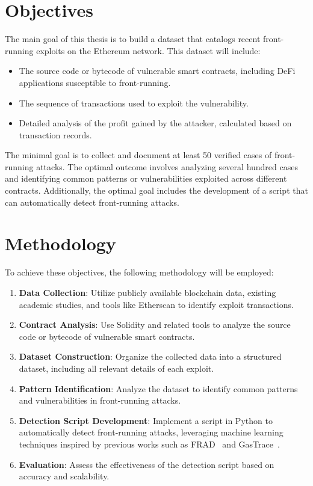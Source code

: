 \documentclass{scrartcl}
\begin{document}
\section*{Objectives}

The main goal of this thesis is to build a dataset that catalogs recent front-running exploits on the Ethereum network. This dataset will include:

\begin{itemize}
    \item The source code or bytecode of vulnerable smart contracts, including DeFi applications susceptible to front-running.
    \item The sequence of transactions used to exploit the vulnerability.
    \item Detailed analysis of the profit gained by the attacker, calculated based on transaction records.
\end{itemize}

The minimal goal is to collect and document at least 50 verified cases of front-running attacks. The optimal outcome involves analyzing several hundred cases and identifying common patterns or vulnerabilities exploited across different contracts. Additionally, the optimal goal includes the development of a script that can automatically detect front-running attacks.

\section*{Methodology}

To achieve these objectives, the following methodology will be employed:

\begin{enumerate}
    \item \textbf{Data Collection}: Utilize publicly available blockchain data, existing academic studies, and tools like Etherscan to identify exploit transactions.
    \item \textbf{Contract Analysis}: Use Solidity and related tools to analyze the source code or bytecode of vulnerable smart contracts.
    \item \textbf{Dataset Construction}: Organize the collected data into a structured dataset, including all relevant details of each exploit.
    \item \textbf{Pattern Identification}: Analyze the dataset to identify common patterns and vulnerabilities in front-running attacks.
    \item \textbf{Detection Script Development}: Implement a script in Python to automatically detect front-running attacks, leveraging machine learning techniques inspired by previous works such as FRAD~\cite{FRAD24} and GasTrace~\cite{GasTrace26}.
    \item \textbf{Evaluation}: Assess the effectiveness of the detection script based on accuracy and scalability.
\end{enumerate}
\end{document}
